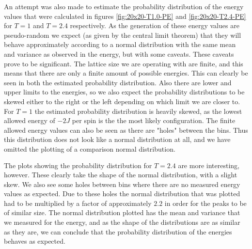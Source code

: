 \documentclass[reprint,english,notitlepage]{revtex4-1}  %
\begin{document}
An attempt was also made to estimate the probability distribution of the energy values that were calculated in figures \ref{fig:20x20-T1.0-PE} and \ref{fig:20x20-T2.4-PE} for $T=1$ and $T=2.4$ respectively. As the generation of these energy values are pseudo-random we expect (as given by the central limit theorem) that they will behave approximately according to a normal distribution with the same mean and variance as observed in the energy, but with some caveats. These caveats prove to be significant. The lattice size we are operating with are finite, and this means that there are only a finite amount of possible energies. This can clearly be seen in both the estimated probability distribution. Also there are lower and upper limits to the energies, so we also expect the probability distributions to be skewed either to the right or the left depending on which limit we are closer to. For $T=1$ the estimated probability distribution is heavily skewed, as the lowest allowed energy of $-2J$ per spin is the the most likely configuration. The finite allowed energy values can also be seen as there are "holes" between the bins. Thus this distribution does not look like a normal distribution at all, and we have omitted the plotting of a comparison normal distribution. 

The plots showing the probability distribution for $T=2.4$ are more interesting, however. These clearly take the shape of the normal distribution, with a slight skew. We also see some holes between bins where there are no measured energy values as expected. Due to these holes the normal distribution that was plotted had to be multiplied by a factor of approximately $2.2$ in order for the peaks to be of similar size. The normal distribution plotted has the mean and variance that we measured for the energy, and as the shape of the distributions are as similar as they are, we can conclude that the probability distribution of the energies behaves as expected.
\end{document}
